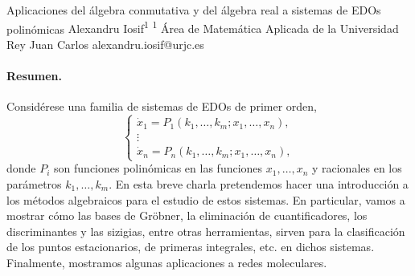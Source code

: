 \documentclass[11pt,a4paper]{article}
\begin{document}

\begin{sincabstract}
{Aplicaciones del álgebra conmutativa y del álgebra real a sistemas de EDOs polinómicas}
{Alexandru Iosif\textsuperscript{1}}
{\textsuperscript{1} Área de Matemática Aplicada de la Universidad Rey Juan Carlos}
{alexandru.iosif@urjc.es}

\paragraph{Resumen.}
Considérese una familia de sistemas de EDOs de primer orden,
\begin{equation*}
\begin{cases}
\dot{x}_1 = P_1(k_1,\ldots,k_m;x_1,\ldots,x_n),\\
\vdots\\
\dot{x}_n = P_n(k_1,\ldots,k_m;x_1,\ldots,x_n),
\end{cases}
\end{equation*}
donde $P_i$ son funciones polinómicas en las funciones $x_1,\ldots,x_n$ y racionales en los parámetros $k_1,\ldots,k_m$. En esta breve charla pretendemos hacer una introducción a los métodos algebraicos para el estudio de estos sistemas. En particular, vamos a mostrar cómo las bases de Gröbner, la eliminación de cuantificadores, los discriminantes y las sizigias, entre otras herramientas, sirven para la clasificación de los puntos estacionarios, de primeras integrales, etc. en dichos sistemas. Finalmente, mostramos algunas aplicaciones a redes moleculares.



\end{sincabstract}
\end{document}
